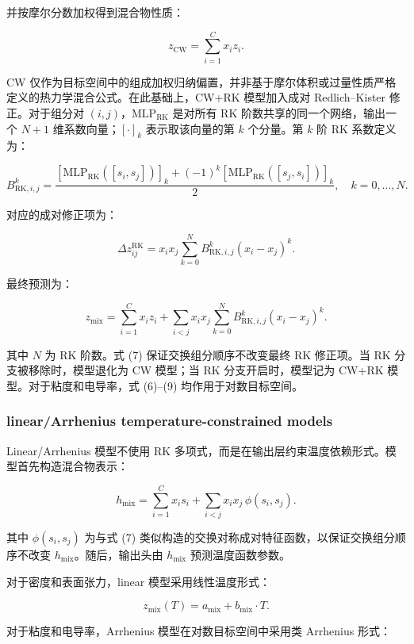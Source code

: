 \documentclass[journal=jctcce,manuscript=article,doi=true]{achemso}
\providecommand{\texorpdfstring}[2]{#1}
\begin{document}
并按摩尔分数加权得到混合物性质：

\[
z_{\mathrm{CW}}=\sum_{i=1}^{C}x_i z_i.
\tag{6}
\]

CW 仅作为目标空间中的组成加权归纳偏置，并非基于摩尔体积或过量性质严格定义的热力学混合公式。在此基础上，CW+RK 模型加入成对 Redlich--Kister 修正。对于组分对 \((i,j)\)，\(\mathrm{MLP}_{\mathrm{RK}}\) 是对所有 RK 阶数共享的同一个网络，输出一个 \(N+1\) 维系数向量；\([\cdot]_k\) 表示取该向量的第 \(k\) 个分量。第 \(k\) 阶 RK 系数定义为：

\[
B^k_{\mathrm{RK},i,j}
=
\frac{
\left[\mathrm{MLP}_{\mathrm{RK}}([s_i,s_j])\right]_k
+(-1)^k\left[\mathrm{MLP}_{\mathrm{RK}}([s_j,s_i])\right]_k
}{2},
\quad k=0,\ldots,N.
\tag{7}
\]

对应的成对修正项为：

\[
\Delta z_{ij}^{\mathrm{RK}}
=
x_i x_j
\sum_{k=0}^{N}B^k_{\mathrm{RK},i,j}(x_i-x_j)^k.
\tag{8}
\]

最终预测为：

\[
z_{\mathrm{mix}}
=
\sum_{i=1}^{C}x_i z_i
+
\sum_{i< j}x_i x_j
\sum_{k=0}^{N}B^k_{\mathrm{RK},i,j}(x_i-x_j)^k.
\tag{9}
\]

\noindent 其中 \(N\) 为 RK 阶数。式 (7) 保证交换组分顺序不改变最终 RK 修正项。当 RK 分支被移除时，模型退化为 CW 模型；当 RK 分支开启时，模型记为 CW+RK 模型。对于粘度和电导率，式 (6)--(9) 均作用于对数目标空间。

\subsubsection{\texorpdfstring{linear/Arrhenius temperature-constrained models}{linear/Arrhenius temperature-constrained models}}\label{lineararrhenius-temperature-constrained-models}

Linear/Arrhenius 模型不使用 RK 多项式，而是在输出层约束温度依赖形式。模型首先构造混合物表示：

\[
h_{\mathrm{mix}}
=
\sum_{i=1}^{C}x_i s_i
+
\sum_{i< j}x_i x_j\,
\phi(s_i,s_j).
\tag{10}
\]

\noindent 其中 \(\phi(s_i,s_j)\) 为与式 (7) 类似构造的交换对称成对特征函数，以保证交换组分顺序不改变 \(h_{\mathrm{mix}}\)。随后，输出头由 \(h_{\mathrm{mix}}\) 预测温度函数参数。

对于密度和表面张力，linear 模型采用线性温度形式：

\[
z_{\mathrm{mix}}(T)=a_{\mathrm{mix}}+b_{\mathrm{mix}}\cdot T.
\tag{11}
\]

对于粘度和电导率，Arrhenius 模型在对数目标空间中采用类 Arrhenius 形式：
\end{document}
